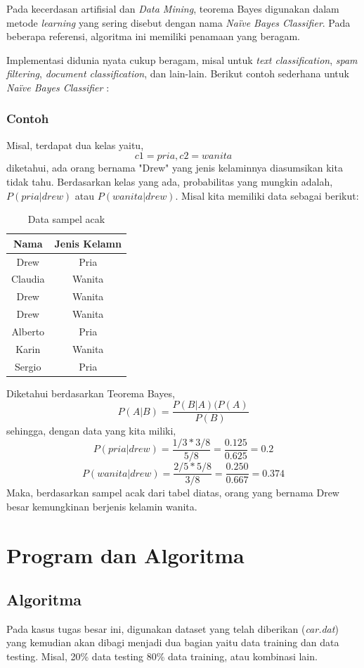 \documentclass[11pt,a4paper]{report}
\begin{document}
	Pada kecerdasan artifisial dan \emph{Data Mining}, teorema Bayes digunakan dalam metode \emph{learning} yang sering disebut dengan nama \emph{Na\"{i}ve Bayes Classifier}. Pada beberapa referensi, algoritma ini memiliki penamaan yang beragam.
	
	Implementasi didunia nyata cukup beragam, misal untuk \emph{text classification}, \emph{spam filtering}, \emph{document classification}, dan lain-lain. Berikut contoh sederhana untuk \emph{Na\"{i}ve Bayes Classifier} : 
	\subsection{Contoh}
	Misal, terdapat dua kelas yaitu,
	\[ c1=pria, c2=wanita \]
	diketahui, ada orang bernama "Drew" yang jenis kelaminnya diasumsikan kita tidak tahu. Berdasarkan kelas yang ada, probabilitas yang mungkin adalah, $P(pria|drew)$ atau $P(wanita|drew)$.
	Misal kita memiliki data sebagai berikut:
	
	\begin{table}[h]
		\centering
		\begin{tabular}{|c|c|}
			\hline Nama & Jenis Kelamn \\ 
			\hline Drew & Pria \\ 
			\hline Claudia & Wanita \\ 
			\hline Drew & Wanita \\ 
			\hline Drew & Wanita \\ 
			\hline Alberto & Pria \\ 
			\hline Karin & Wanita \\ 
			\hline Sergio & Pria \\ 
			\hline 
		\end{tabular}
		\caption{Data sampel acak}
	\end{table} 
	
	Diketahui berdasarkan Teorema Bayes,
	\[ P(A|B) = \frac{P(B|A)(P(A)}{P(B)}\]
	sehingga, dengan data yang kita miliki,
	\[ P(pria|drew) = \frac{1/3*3/8}{5/8}=\frac{0.125}{0.625}=0.2\]
	\[ P(wanita|drew) = \frac{2/5*5/8}{3/8}=\frac{0.250}{0.667}=0.374\]
	Maka, berdasarkan sampel acak dari tabel diatas, orang yang bernama Drew besar kemungkinan berjenis kelamin wanita.
	\newpage
	\chapter{Program dan Algoritma}
	\section{Algoritma}
	Pada kasus tugas besar ini, digunakan dataset yang telah diberikan (\emph{car.dat}) yang kemudian akan dibagi menjadi dua bagian yaitu data training dan data testing. Misal, 20\% data testing 80\% data training, atau kombinasi lain.
	
\end{document}

